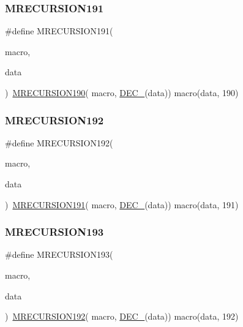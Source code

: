 \subsubsection{\texorpdfstring{MRECURSION191}{MRECURSION191}}
{\footnotesize\ttfamily \#define M\+R\+E\+C\+U\+R\+S\+I\+O\+N191(\begin{DoxyParamCaption}\item[{}]{macro,  }\item[{}]{data }\end{DoxyParamCaption})~\mbox{\hyperlink{group__group__sam0__utils__mrecursion_gae01f94ced8dcefc1af77936aec9b55a7}{M\+R\+E\+C\+U\+R\+S\+I\+O\+N190}}(  macro, \mbox{\hyperlink{group__group__sam0__utils__mrecursion_ga1d23d683797679dca8c3512a54a5dcae}{D\+E\+C\+\_\+}}(data))   macro(data, 190)}

\mbox{\label{group__group__sam0__utils__mrecursion_ga51b19514621a674f7708f6b0636ad2be}} 
\subsubsection{\texorpdfstring{MRECURSION192}{MRECURSION192}}
{\footnotesize\ttfamily \#define M\+R\+E\+C\+U\+R\+S\+I\+O\+N192(\begin{DoxyParamCaption}\item[{}]{macro,  }\item[{}]{data }\end{DoxyParamCaption})~\mbox{\hyperlink{group__group__sam0__utils__mrecursion_ga6932bbd13a4e01b7042880a747a2f031}{M\+R\+E\+C\+U\+R\+S\+I\+O\+N191}}(  macro, \mbox{\hyperlink{group__group__sam0__utils__mrecursion_ga1d23d683797679dca8c3512a54a5dcae}{D\+E\+C\+\_\+}}(data))   macro(data, 191)}

\mbox{\label{group__group__sam0__utils__mrecursion_ga646ecde91e6819ac487b0b8f7bc6a7c1}} 
\subsubsection{\texorpdfstring{MRECURSION193}{MRECURSION193}}
{\footnotesize\ttfamily \#define M\+R\+E\+C\+U\+R\+S\+I\+O\+N193(\begin{DoxyParamCaption}\item[{}]{macro,  }\item[{}]{data }\end{DoxyParamCaption})~\mbox{\hyperlink{group__group__sam0__utils__mrecursion_ga51b19514621a674f7708f6b0636ad2be}{M\+R\+E\+C\+U\+R\+S\+I\+O\+N192}}(  macro, \mbox{\hyperlink{group__group__sam0__utils__mrecursion_ga1d23d683797679dca8c3512a54a5dcae}{D\+E\+C\+\_\+}}(data))   macro(data, 192)}

